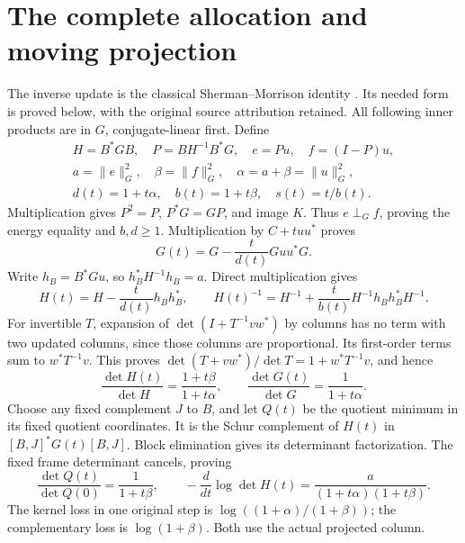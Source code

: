 \documentclass[11pt]{article}
\begin{document}
\section{The complete allocation and moving projection}
The inverse update is the classical Sherman--Morrison identity
\cite{SM}. Its needed form is proved below, with the original
source attribution retained.
All following inner products are in \(G\), conjugate-linear first.
Define
\begin{equation}\tag{ACC3}
\begin{gathered}
H=B^*GB,\quad P=BH^{-1}B^*G,\quad e=Pu,\quad f=(I-P)u,\\
a=\|e\|_G^2,\quad\beta=\|f\|_G^2,\quad\alpha=a+\beta=\|u\|_G^2,\\
d(t)=1+t\alpha,\quad b(t)=1+t\beta,\quad s(t)=t/b(t).
\end{gathered}
\end{equation}
Multiplication gives \(P^2=P\), \(P^*G=GP\), and image \(K\).
Thus \(e\perp_G f\), proving the energy equality and \(b,d\ge1\).
Multiplication by \(C+tuu^*\) proves
\begin{equation}\tag{ACC4}
G(t)=G-\frac{t}{d(t)}Guu^*G.
\end{equation}
Write \(h_B=B^*Gu\), so \(h_B^*H^{-1}h_B=a\). Direct multiplication gives
\begin{equation}\tag{ACC5}
H(t)=H-\frac{t}{d(t)}h_Bh_B^*,\qquad
H(t)^{-1}=H^{-1}+\frac{t}{b(t)}H^{-1}h_Bh_B^*H^{-1}.
\end{equation}
For invertible \(T\), expansion of \(\det(I+T^{-1}vw^*)\) by columns
has no term with two updated columns, since those columns are
proportional. Its first-order terms sum to \(w^*T^{-1}v\).
This proves \(\det(T+vw^*)/\det T=1+w^*T^{-1}v\), and hence
\begin{equation}\tag{ACC6}
\boxed{\frac{\det H(t)}{\det H}=\frac{1+t\beta}{1+t\alpha},\qquad
\frac{\det G(t)}{\det G}=\frac1{1+t\alpha}.}
\end{equation}
Choose any fixed complement \(J\) to \(B\), and let \(Q(t)\) be
the quotient minimum in its fixed quotient coordinates. It is the
Schur complement of \(H(t)\) in \([B,J]^*G(t)[B,J]\).
Block elimination gives its determinant factorization. The fixed
frame determinant cancels, proving
\begin{equation}\tag{ACC7}
\boxed{\frac{\det Q(t)}{\det Q(0)}=\frac1{1+t\beta},\qquad
-\frac{d}{dt}\log\det H(t)=
\frac{a}{(1+t\alpha)(1+t\beta)}.}
\end{equation}
The kernel loss in one original step is
\(\log((1+\alpha)/(1+\beta))\); the complementary loss is
\(\log(1+\beta)\). Both use the actual projected column.
\end{document}
